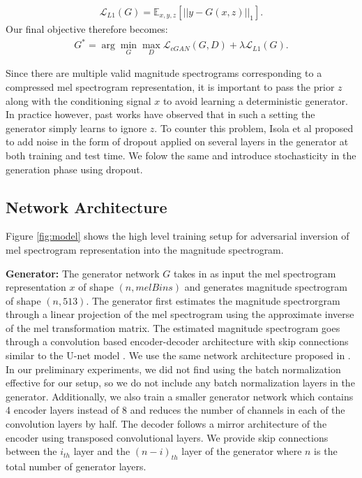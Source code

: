 \documentclass[a4paper]{article}
\begin{document}
\begin{align}
    \mathcal{L}_{L1}(G) = \mathbb{E}_{x,y,z}[{||y-G(x,z)||}_1].\label{L1_equation}
\end{align}
Our final objective therefore becomes:
\begin{align}
    G^*  = \arg\min_G\max_D \mathcal{L}_{cGAN}(G,D) + \lambda \mathcal{L}_{L1}(G).\label{full_objective}
\end{align}

Since there are multiple valid magnitude spectrograms corresponding to a compressed mel spectrogram representation, it is important to pass the prior $z$ along with the conditioning signal $x$ to avoid learning a deterministic generator. In practice however, past works \cite{Mathieu2016DeepMV,pix2pix} have observed that in such a setting the generator simply learns to ignore $z$. To counter this problem, Isola et al \cite{pix2pix} proposed to add noise in the form of dropout applied on several layers in the generator at both training and test time. We folow the same and introduce stochasticity in the generation phase using dropout.

\subsection{Network Architecture}
Figure \ref{fig:model} shows the high level training setup for adversarial inversion of mel spectrogram representation into the magnitude spectrogram.

\textbf{Generator:} The generator network $G$ takes in as input the mel spectrogram representation $x$ of shape $(n, \mathit{melBins})$ and generates magnitude spectrogram of shape $(n, 513)$. The generator first estimates the magnitude spectrorgram through a linear projection of the mel spectrogram using the approximate inverse of the mel transformation matrix. The estimated magnitude spectrogram goes through a convolution based encoder-decoder architecture with skip connections similar to the U-net model \cite{unet}. We use the same network architecture proposed in \cite{pix2pix}. In our preliminary experiments, we did not find using the batch normalization effective for our setup, so we do not include any batch normalization layers in the generator. Additionally, we also train a smaller generator network which contains 4 encoder layers instead of 8 and reduces the number of channels in each of the convolution layers by half. The decoder follows a mirror architecture of the encoder using transposed convolutional layers. We provide skip connections between the $i_{th}$ layer and the $(n-i)_{th}$ layer of the generator where $n$ is the total number of generator layers.
\end{document}
